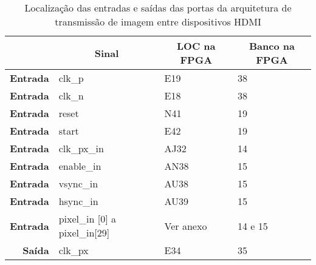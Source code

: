 \begin{table}[h!]
	\centering
		\caption{Localização das entradas e saídas das portas da arquitetura de transmissão de imagem entre dispositivos HDMI}
	\label{table:LOCplanB_simples}
		\begin{tabular}{rlll}
			\hline
			\multicolumn{1}{c}{\textbf{}}         & \multicolumn{1}{c}{\textbf{Sinal}}    & \multicolumn{1}{c}{\textbf{LOC na FPGA}} & \multicolumn{1}{c}{\textbf{Banco na FPGA}} \\ \hline
			\multicolumn{1}{r|}{\textbf{Entrada}} & clk\_p                                & E19                                      & 38                                         \\
			\multicolumn{1}{r|}{\textbf{Entrada}} & clk\_n                                & E18                                      & 38                                         \\
			\multicolumn{1}{r|}{\textbf{Entrada}} & reset                                 & N41                                      & 19                                         \\
			\multicolumn{1}{r|}{\textbf{Entrada}} & start                                 & E42                                      & 19                                         \\
			\multicolumn{1}{r|}{\textbf{Entrada}} & clk\_px\_in                           & AJ32                                     & 14                                         \\
			\multicolumn{1}{r|}{\textbf{Entrada}} & enable\_in                            & AN38                                     & 15                                         \\
			\multicolumn{1}{r|}{\textbf{Entrada}} & vsync\_in                             & AU38                                     & 15                                         \\
			\multicolumn{1}{r|}{\textbf{Entrada}} & hsync\_in                             & AU39                                     & 15                                         \\
			\multicolumn{1}{r|}{\textbf{Entrada}} & pixel\_in {[}0{]} a pixel\_in{[}29{]} & Ver anexo                                & 14 e 15                                    \\
			\multicolumn{1}{r|}{\textbf{Saída}}   & clk\_px                               & E34                                      & 35                                         \\

\end{tabular}
\end{table}
